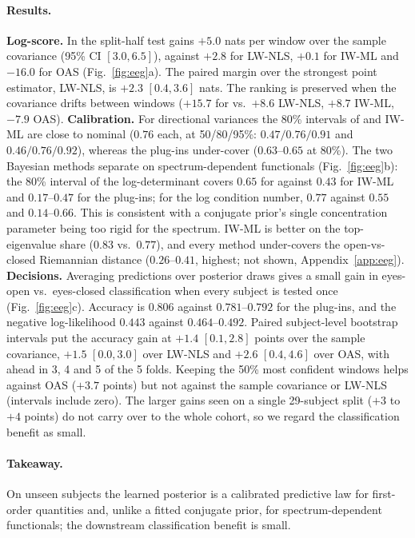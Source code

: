 \paragraph{Results.}
\textbf{Log-score.}
In the split-half test \scsi{} gains $+5.0$ nats per window over the sample covariance (95\% CI $[3.0,6.5]$), against $+2.8$ for LW-NLS, $+0.1$ for IW-ML and $-16.0$ for OAS (Fig.~\ref{fig:eeg}a).
The paired margin over the strongest point estimator, LW-NLS, is $+2.3$ $[0.4,3.6]$ nats.
The ranking is preserved when the covariance drifts between windows ($+15.7$ for \scsi{} vs.\ $+8.6$ LW-NLS, $+8.7$ IW-ML, $-7.9$ OAS).
\textbf{Calibration.}
For directional variances the 80\% intervals of \scsi{} and IW-ML are close to nominal ($0.76$ each, at 50/80/95\%: $0.47/0.76/0.91$ and $0.46/0.76/0.92$), whereas the plug-ins under-cover ($0.63$--$0.65$ at 80\%).
The two Bayesian methods separate on spectrum-dependent functionals (Fig.~\ref{fig:eeg}b): the 80\% interval of the log-determinant covers $0.65$ for \scsi{} against $0.43$ for IW-ML and $0.17$--$0.47$ for the plug-ins; for the log condition number, $0.77$ against $0.55$ and $0.14$--$0.66$.
This is consistent with a conjugate prior's single concentration parameter being too rigid for the spectrum.
IW-ML is better on the top-eigenvalue share ($0.83$ vs.\ $0.77$), and every method under-covers the open-vs-closed Riemannian distance ($0.26$--$0.41$, \scsi{} highest; not shown, Appendix~\ref{app:eeg}).
\textbf{Decisions.}
Averaging predictions over posterior draws gives a small gain in eyes-open vs.\ eyes-closed classification when every subject is tested once (Fig.~\ref{fig:eeg}c).
Accuracy is $0.806$ against $0.781$--$0.792$ for the plug-ins, and the negative log-likelihood $0.443$ against $0.464$--$0.492$.
Paired subject-level bootstrap intervals put the accuracy gain at $+1.4$ $[0.1,2.8]$ points over the sample covariance, $+1.5$ $[0.0,3.0]$ over LW-NLS and $+2.6$ $[0.4,4.6]$ over OAS, with \scsi{} ahead in 3, 4 and 5 of the 5 folds.
Keeping the 50\% most confident windows helps against OAS ($+3.7$ points) but not against the sample covariance or LW-NLS (intervals include zero).
The larger gains seen on a single 29-subject split ($+3$ to $+4$ points) do not carry over to the whole cohort, so we regard the classification benefit as small.

\paragraph{Takeaway.}
On unseen subjects the learned posterior is a calibrated predictive law for first-order quantities and, unlike a fitted conjugate prior, for spectrum-dependent functionals; the downstream classification benefit is small.

